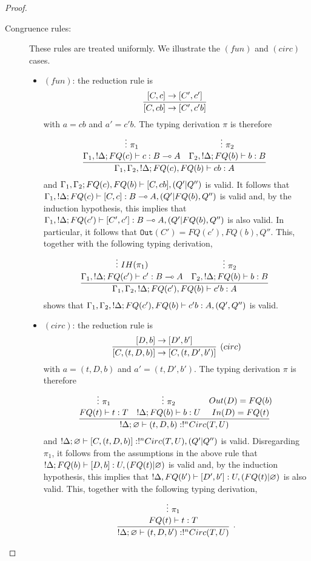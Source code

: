 \documentclass{article}
\begin{document}
\begin{proof}
\begin{description}
\item[Congruence rules:] These rules are treated uniformly. We illustrate the 
$(fun)$ and $(circ)$ cases.
\begin{itemize}
  \item $(fun)$: the reduction rule is
  \[
    \infer[]{[C,cb]\to[C',c'b]}{
      [C,c]\to[C',c']
    }
  \]
  with $a=cb$ and $a'=c'b$. The typing derivation $\pi$ is therefore
  \[
    \infer[]{\Gamma_1,\Gamma_2, !\Delta;FQ(c),FQ(b)\entails cb:A}{
      \deduce[]{\Gamma_1, !\Delta;FQ(c)\entails c:B\loli A}{
        \vdots~\pi_1
      } 
      &
      \deduce[]{\Gamma_2, !\Delta ;FQ(b)\entails b:B}{
        \vdots~\pi_2
      } 
    }
  \]
  and $\Gamma_1,\Gamma_2;FQ(c),FQ(b)\vdash [C, cb],(Q'|Q'')$ is valid.
  It follows that $\Gamma_1, !\Delta;FQ(c)\vdash [C,c]:B\multimap A,(Q'|FQ(b),Q'')$ 
  is valid and, by the induction hypothesis, this implies that 
  $\Gamma_1, !\Delta;FQ(c')\vdash [C',c']:B\multimap A,(Q'|FQ(b),Q'')$ is also valid.
  In particular, it follows that $\mathtt{Out}(C')=FQ(c'),FQ(b),Q''$. This, 
  together with the following typing derivation,
  \[
    \infer[]{\Gamma_1,\Gamma_2, !\Delta;FQ(c'),FQ(b)\entails c'b:A}{
      \deduce[]{\Gamma_1, !\Delta;FQ(c')\entails c':B\loli A}{
        \vdots~IH(\pi_1)
      } 
      &
      \deduce[]{\Gamma_2, !\Delta ;FQ(b)\entails b:B}{
        \vdots~\pi_2
      } 
    }
  \]  
  shows that $\Gamma_1,\Gamma_2, !\Delta;FQ(c'),FQ(b)\vdash c'b:A,(Q',Q'')$ 
  is valid.
  \item $(circ)$: the reduction rule is
  \[
    \infer[(circ)]{[C, (t,D,b)]\to [C, (t,D',b')]}{
      [D,b]\to [D',b']
    }
  \]  
  with $a=(t,D,b)$ and $a'=(t,D',b')$. The typing derivation $\pi$ is therefore
  \[
  \infer[]{!\Delta;\varnothing\entails (t,D,b):!^nCirc(T,U)}{
    \deduce[]{FQ(t)\entails t:T}{
      \vdots~\pi_1
    } 
    &
    \deduce[]{!\Delta ; FQ(b)\entails b:U}{
      \vdots~\pi_2
    }
    &
    \deduce[]{In(D)=FQ(t)}{
      Out(D)=FQ(b)
    }
  }
  \]  
  and $!\Delta ; \varnothing \vdash [C,(t,D,b)]:!^nCirc(T,U),(Q'|Q'')$ is valid. 
  Disregarding $\pi_1$, it follows from the assumptions in the above rule 
  that $!\Delta ; FQ(b)\vdash [D,b]:U, (FQ(t)|\varnothing)$ is valid and, 
  by the induction hypothesis, this implies that 
  $!\Delta,FQ(b')\vdash [D',b']:U,(FQ(t)|\varnothing)$ is also valid.
  This, together with the following typing derivation,
  \[
  \infer[.]{!\Delta;\varnothing\entails (t,D,b'):!^nCirc(T,U)}{
    \deduce[]{FQ(t)\entails t:T}{
      \vdots~\pi_1
}}\]
\end{itemize}
\end{description}
\end{proof}
\end{document}
